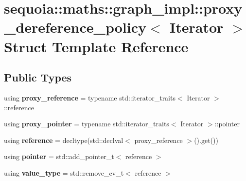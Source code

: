 \hypertarget{structsequoia_1_1maths_1_1graph__impl_1_1proxy__dereference__policy}{}\section{sequoia\+::maths\+::graph\+\_\+impl\+::proxy\+\_\+dereference\+\_\+policy$<$ Iterator $>$ Struct Template Reference}
\label{structsequoia_1_1maths_1_1graph__impl_1_1proxy__dereference__policy}
\subsection*{Public Types}
\begin{DoxyCompactItemize}
\item 
\mbox{\label{structsequoia_1_1maths_1_1graph__impl_1_1proxy__dereference__policy_a8ec36db23a5b6d00dbbc08b48a90ab3b}} 
using {\bfseries proxy\+\_\+reference} = typename std\+::iterator\+\_\+traits$<$ Iterator $>$\+::reference
\item 
\mbox{\label{structsequoia_1_1maths_1_1graph__impl_1_1proxy__dereference__policy_a16bf224a8afb93fd232b48ff0c6a64e4}} 
using {\bfseries proxy\+\_\+pointer} = typename std\+::iterator\+\_\+traits$<$ Iterator $>$\+::pointer
\item 
\mbox{\label{structsequoia_1_1maths_1_1graph__impl_1_1proxy__dereference__policy_ab9e564e0eeb01434f593870d931c1d41}} 
using {\bfseries reference} = decltype(std\+::declval$<$ proxy\+\_\+reference $>$().get())
\item 
\mbox{\label{structsequoia_1_1maths_1_1graph__impl_1_1proxy__dereference__policy_a0dfcdce6a5454e3e3d46916083bb6d2c}} 
using {\bfseries pointer} = std\+::add\+\_\+pointer\+\_\+t$<$ reference $>$
\item 
\mbox{\label{structsequoia_1_1maths_1_1graph__impl_1_1proxy__dereference__policy_ae34818e773e41ad6d7d8225afc8c38c4}} 
using {\bfseries value\+\_\+type} = std\+::remove\+\_\+cv\+\_\+t$<$ reference $>$
\end{DoxyCompactItemize}
